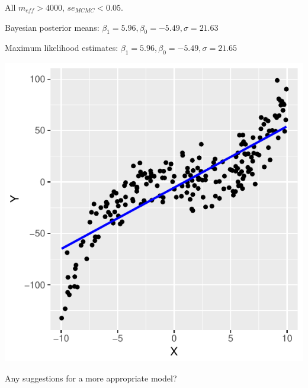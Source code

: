 \begin{frame}
\begin{analysis}
\smallskip

All $m_{eff} > 4000$, $se_{MCMC} < 0.05$.

\smallskip

\begin{tiny}
Bayesian posterior means: \hfill $\beta_1 = 5.96, \beta_0 = -5.49, \sigma = 21.63$

Maximum likelihood estimates: \hfill $\beta_1 = 5.96, \beta_0 = -5.49, \sigma = 21.65$
\end{tiny}

\smallskip
\end{analysis}
\end{frame}

\begin{frame}
\begin{analysis}

\bigskip

\bigskip

\smallskip

\begin{center}
\includegraphics[width=0.40\linewidth]{../LectureAssets/L04/SimpleReg03}
\end{center}

Any suggestions for a more appropriate model?

\smallskip
\end{analysis}
\end{frame}

